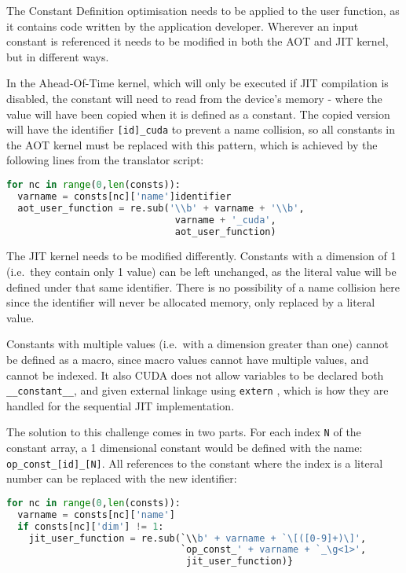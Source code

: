  The Constant Definition optimisation needs to be applied to the user function, as it contains code written by the application developer. Wherever an input constant is referenced it needs to be modified in both the AOT and JIT kernel, but in different ways.

In the Ahead-Of-Time kernel, which will only be executed if JIT compilation is disabled, the constant will need to read from the device's memory - where the value will have been copied when it is defined as a constant. The copied version will have the identifier \verb|[id]_cuda| to prevent a name collision, so all constants in the AOT kernel must be replaced with this pattern, which is achieved by the following lines from the translator script:\\
\begin{lstlisting}[backgroundcolor = \color{lightgray!20}, language=Python]
for nc in range(0,len(consts)):
  varname = consts[nc]['name']identifier
  aot_user_function = re.sub('\\b' + varname + '\\b',
                              varname + '_cuda',
                              aot_user_function)
\end{lstlisting}

The JIT kernel needs to be modified differently. Constants with a dimension of 1 (i.e.\ they contain only 1 value) can be left unchanged, as the literal value will be defined under that same identifier. There is no possibility of a name collision here since the identifier will never be allocated memory, only replaced by a literal value.
\par
Constants with multiple values (i.e.\ with a dimension greater than one) cannot be defined as a macro, since macro values cannot have multiple values, and cannot be indexed. It also CUDA does not allow variables to be declared both \verb|__constant__|, and given external linkage using \verb|extern| \cite[p126]{guide}, which is how they are handled for the sequential JIT implementation.
\par
The solution to this challenge comes in two parts. For each index \verb|N| of the constant array, a 1 dimensional constant would be defined with the name:\\ \verb|op_const_[id]_[N]|. All references to the constant where the index is a literal number can be replaced with the new identifier:
\begin{lstlisting}[backgroundcolor = \color{lightgray!20}, language=Python]
for nc in range(0,len(consts)):
  varname = consts[nc]['name']
  if consts[nc]['dim'] != 1:
    jit_user_function = re.sub(`\\b' + varname + `\[([0-9]+)\]',
                               `op_const_' + varname + `_\g<1>',
                                jit_user_function)}
\end{lstlisting}

